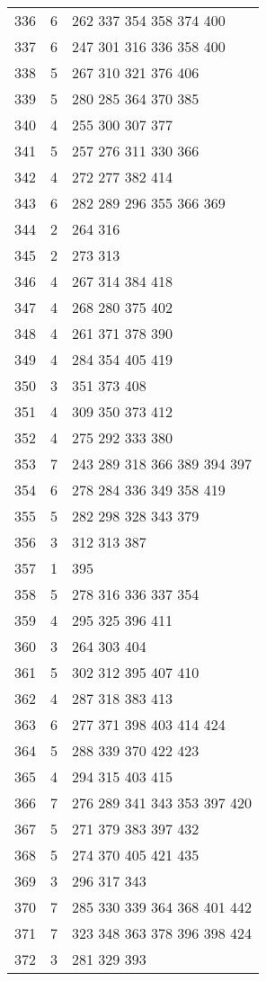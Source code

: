 \documentclass{standalone}
\begin{document}
\begin{tabular}{c c l}
336 & 6 & 262 337 354 358 374 400 \\
337 & 6 & 247 301 316 336 358 400 \\
338 & 5 & 267 310 321 376 406 \\
339 & 5 & 280 285 364 370 385 \\
340 & 4 & 255 300 307 377 \\
341 & 5 & 257 276 311 330 366 \\
342 & 4 & 272 277 382 414 \\
343 & 6 & 282 289 296 355 366 369 \\
344 & 2 & 264 316 \\
345 & 2 & 273 313 \\
346 & 4 & 267 314 384 418 \\
347 & 4 & 268 280 375 402 \\
348 & 4 & 261 371 378 390 \\
349 & 4 & 284 354 405 419 \\
350 & 3 & 351 373 408 \\
351 & 4 & 309 350 373 412 \\
352 & 4 & 275 292 333 380 \\
353 & 7 & 243 289 318 366 389 394 397 \\
354 & 6 & 278 284 336 349 358 419 \\
355 & 5 & 282 298 328 343 379 \\
356 & 3 & 312 313 387 \\
357 & 1 & 395 \\
358 & 5 & 278 316 336 337 354 \\
359 & 4 & 295 325 396 411 \\
360 & 3 & 264 303 404 \\
361 & 5 & 302 312 395 407 410 \\
362 & 4 & 287 318 383 413 \\
363 & 6 & 277 371 398 403 414 424 \\
364 & 5 & 288 339 370 422 423 \\
365 & 4 & 294 315 403 415 \\
366 & 7 & 276 289 341 343 353 397 420 \\
367 & 5 & 271 379 383 397 432 \\
368 & 5 & 274 370 405 421 435 \\
369 & 3 & 296 317 343 \\
370 & 7 & 285 330 339 364 368 401 442 \\
371 & 7 & 323 348 363 378 396 398 424 \\
372 & 3 & 281 329 393 \\

\end{tabular}
\end{document}

